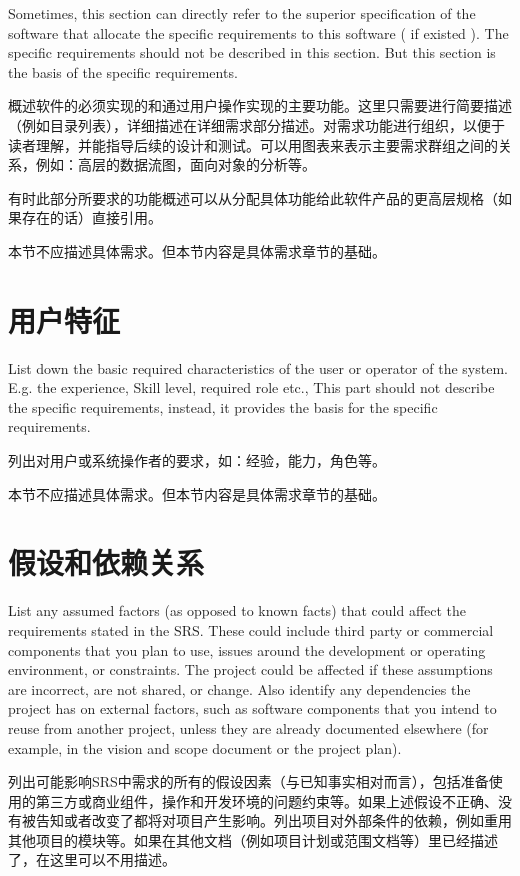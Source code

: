 Sometimes, this section can directly refer to the superior specification of the software that allocate the specific requirements to this software ( if existed ).
The specific requirements should not be described in this section. But this section is the basis of the specific requirements.

概述软件的必须实现的和通过用户操作实现的主要功能。这里只需要进行简要描述（例如目录列表），详细描述在详细需求部分描述。对需求功能进行组织，以便于读者理解，并能指导后续的设计和测试。可以用图表来表示主要需求群组之间的关系，例如：高层的数据流图，面向对象的分析等。

有时此部分所要求的功能概述可以从分配具体功能给此软件产品的更高层规格（如果存在的话）直接引用。

本节不应描述具体需求。但本节内容是具体需求章节的基础。

\section{用户特征}
List down the basic required characteristics of the user or operator of the system. E.g. the experience, Skill level, required role etc.,
This part should not describe the specific requirements, instead, it provides the basis for the specific requirements.

列出对用户或系统操作者的要求，如：经验，能力，角色等。

本节不应描述具体需求。但本节内容是具体需求章节的基础。

\section{假设和依赖关系}
List any assumed factors (as opposed to known facts) that could affect the requirements stated in the SRS. These could include third party or commercial components that you plan to use, issues around the development or operating environment, or constraints. The project could be affected if these assumptions are incorrect, are not shared, or change. Also identify any dependencies the project has on external factors, such as software components that you intend to reuse from another project, unless they are already documented elsewhere (for example, in the vision and scope document or the project plan).

列出可能影响SRS中需求的所有的假设因素（与已知事实相对而言），包括准备使用的第三方或商业组件，操作和开发环境的问题约束等。如果上述假设不正确、没有被告知或者改变了都将对项目产生影响。列出项目对外部条件的依赖，例如重用其他项目的模块等。如果在其他文档（例如项目计划或范围文档等）里已经描述了，在这里可以不用描述。
